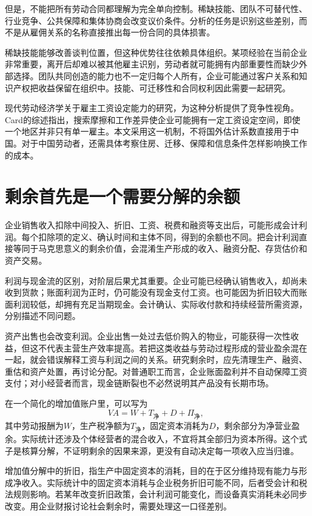 \documentclass[UTF8,fontset=fandol,zihao=-4,oneside,openany]{ctexbook}
\begin{document}
但是，不能把所有劳动合同都理解为完全单向控制。稀缺技能、团队不可替代性、行业竞争、公共保障和集体协商会改变议价条件。分析的任务是识别这些差别，而不是从雇佣关系的名称直接推出每一份合同的具体损害。

\label{arg:P058}
稀缺技能能够改善谈判位置，但这种优势往往依赖具体组织。某项经验在当前企业非常重要，离开后却难以被其他雇主识别，劳动者就可能拥有内部重要性而缺少外部选择。团队共同创造的能力也不一定归每个人所有，企业可能通过客户关系和知识产权把收益保留在组织中。技能、可迁移性和合同权利因此需要一起研究。

现代劳动经济学关于雇主工资设定能力的研究，为这种分析提供了竞争性视角。Card的综述指出，搜索摩擦和工作差异使企业可能拥有一定工资设定空间，即使一个地区并非只有单一雇主。本文采用这一机制，不将国外估计系数直接用于中国。对于中国劳动者，还需具体考察住房、迁移、保障和信息条件怎样影响换工作的成本。\cite{Card2022}

\section{剩余首先是一个需要分解的余额}
企业销售收入扣除中间投入、折旧、工资、税费和融资等支出后，可能形成会计利润。每个扣除项的定义、确认时间和主体不同，得到的余额也不同。把会计利润直接等同于马克思意义的剩余价值，会混淆生产形成的收入、融资分配、存货估价和资产交易。

\label{arg:P059}
利润与现金流的区别，对阶层后果尤其重要。企业可能已经确认销售收入，却尚未收到货款；账面利润为正时，仍可能没有现金支付工资。也可能因为折旧较大而账面利润较低，却拥有充足当期现金。会计确认、实际收付款和持续经营所需资源，分别描述不同问题。

资产出售也会改变利润。企业出售一处过去低价购入的物业，可能获得一次性收益，但这不代表主营生产效率提高。若把这类收益与劳动过程形成的营业盈余混在一起，就会错误解释工资与利润之间的关系。研究剩余时，应先清理生产、融资、重估和资产处置，再讨论分配。对普通职工而言，企业账面盈利并不自动保障工资支付；对小经营者而言，现金链断裂也不必然说明其产品没有长期市场。

在一个简化的增加值账户里，可以写为
\[
VA=W+T_{\text{净}}+D+\Pi_{\text{净}},
\]
其中劳动报酬为$W$，生产税净额为$T_{\text{净}}$，固定资本消耗为$D$，剩余部分为净营业盈余。实际统计还涉及个体经营者的混合收入，不宜将其全部归为资本所得。这个式子是核算分解，不证明剩余的因果来源，更没有自动决定每一项收入应当归谁。

\label{arg:P060}
增加值分解中的折旧，指生产中固定资本的消耗，目的在于区分维持现有能力与形成净收入。实际统计中的固定资本消耗与企业税务折旧可能不同，后者受会计和税法规则影响。若某年改变折旧政策，会计利润可能变化，而设备真实消耗未必同步改变。用企业财报讨论社会剩余时，需要处理这一口径差别。
\end{document}
